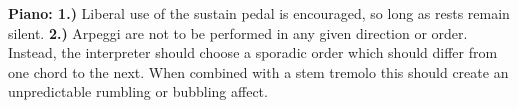 \documentclass[11pt]{article}
\begin{document}
\begingroup
\begin{center}
\textbf{Piano: 1.)} Liberal use of the sustain pedal is encouraged, so long as rests remain silent. \textbf{2.)} Arpeggi are not to be performed in any given direction or order. Instead, the interpreter should choose a sporadic order which should differ from one chord to the next. When combined with a stem tremolo this should create an unpredictable rumbling or bubbling affect. \\
\rightskip\leftskip
\end{center}
\endgroup
\end{document}
